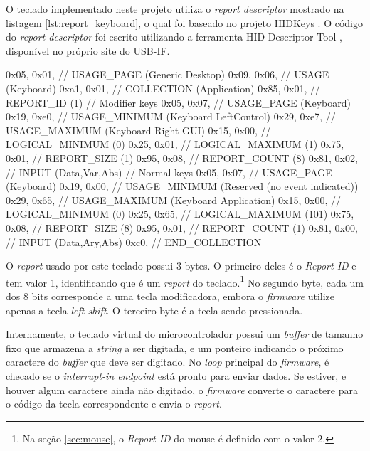 \documentclass[brazil,pagestart=firstchapter]{abnt}
\begin{document}
O teclado implementado neste projeto utiliza o \textit{report descriptor}
mostrado na listagem \ref{lst:report_keyboard}, o qual foi baseado no
projeto HIDKeys \cite{HIDKeys}. O código do \textit{report descriptor} foi
escrito utilizando a ferramenta HID Descriptor Tool \cite{hiddt}, disponível
no próprio site do \ac{USB-IF}.

\begin{ccode}[numbers=none, float=h, label={lst:report_keyboard},
	caption={\textit{Report descriptor} do teclado USB}
]
	0x05, 0x01,        // USAGE_PAGE (Generic Desktop)
	0x09, 0x06,        // USAGE (Keyboard)
	0xa1, 0x01,        // COLLECTION (Application)
	0x85, 0x01,	       //   REPORT_ID (1)
	// Modifier keys
	0x05, 0x07,        //   USAGE_PAGE (Keyboard)
	0x19, 0xe0,        //   USAGE_MINIMUM (Keyboard LeftControl)
	0x29, 0xe7,        //   USAGE_MAXIMUM (Keyboard Right GUI)
	0x15, 0x00,        //   LOGICAL_MINIMUM (0)
	0x25, 0x01,        //   LOGICAL_MAXIMUM (1)
	0x75, 0x01,        //   REPORT_SIZE (1)
	0x95, 0x08,        //   REPORT_COUNT (8)
	0x81, 0x02,        //   INPUT (Data,Var,Abs)
	// Normal keys
	0x05, 0x07,        //   USAGE_PAGE (Keyboard)
	0x19, 0x00,        //   USAGE_MINIMUM (Reserved (no event indicated))
	0x29, 0x65,        //   USAGE_MAXIMUM (Keyboard Application)
	0x15, 0x00,        //   LOGICAL_MINIMUM (0)
	0x25, 0x65,        //   LOGICAL_MAXIMUM (101)
	0x75, 0x08,        //   REPORT_SIZE (8)
	0x95, 0x01,        //   REPORT_COUNT (1)
	0x81, 0x00,        //   INPUT (Data,Ary,Abs)
	0xc0,              // END_COLLECTION
\end{ccode}

O \textit{report} usado por este teclado possui 3 bytes. O primeiro deles é
o \textit{Report ID} e tem valor 1, identificando que é um \textit{report}
do teclado.\footnote{
	Na seção \ref{sec:mouse}, o \textit{Report ID} do mouse é definido com
	o valor 2.
} No segundo byte, cada um dos 8 bits corresponde a uma tecla modificadora,
embora o \textit{firmware} utilize apenas a tecla \textit{left shift}. O
terceiro byte é a tecla sendo pressionada.

Internamente, o teclado virtual do microcontrolador possui um
\textit{buffer} de tamanho fixo que armazena a \textit{string} a ser
digitada, e um ponteiro indicando o próximo caractere do \textit{buffer} que
deve ser digitado. No \textit{loop} principal do \textit{firmware}, é
checado se o \textit{interrupt-in endpoint} está pronto para enviar dados.
Se estiver, e houver algum caractere ainda não digitado, o \textit{firmware}
converte o caractere para o código da tecla correspondente e envia o
\textit{report}.
\end{document}
